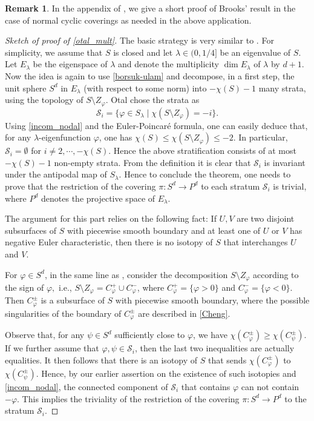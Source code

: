 \documentclass[a4paper,11pt]{amsart}
\numberwithin{equation}{section}
\theoremstyle{definition}
\newtheorem{rem}[equation]{Remark}
\def\vf{\varphi}
\begin{document}
\begin{rem} 
In the appendix of \cite{BMM3}, we give a short proof of Brooks' result in the case of normal cyclic coverings
as needed in the above application.
\end{rem}

\begin{proof}[Sketch of proof of \cref{otal_mult}]
The basic strategy is very similar to \cite{Se}.
For simplicity, we assume that $S$ is closed and let $\lambda\in(0,1/4]$ be an eigenvalue of $S$.
Let $E_\lambda$ be the eigenspace of $\lambda$
and denote the multiplicity $\dim E_\lambda$ of $\lambda$ by $d+1$.
Now the idea is again to use \cref{borsuk-ulam} and decompose, in a first step, the unit sphere $S^d$ in $E_\lambda$ (with respect to some norm) into $-\chi(S) -1$ many strata, using the topology of $S\setminus Z_\vf$. 
Otal chose the strata as
\begin{equation*}
\mathcal{S}_i = \{\varphi \in S_\lambda \mid \chi(S \setminus Z_\varphi)= -i\}.
\end{equation*}
Using \cref{incom_nodal} and the Euler-Poincar\'{e} formula, one can easily deduce that, for any $\lambda$-eigenfunction $\vf$, one has $ \chi(S) \le \chi(S \setminus Z_{\vf}) \le -2$.
In particular, $\mathcal{S}_i=\emptyset$ for $i \neq 2, \cdots, -\chi(S).$
Hence the above stratification consists of at most $-\chi(S) -1$ non-empty strata. 
From the definition it is clear that $\mathcal{S}_i$ is invariant under the antipodal map of $S_\lambda$.
Hence to conclude the theorem, one needs to prove that the restriction of the covering $\pi\colon S^d\to P^d$ to each stratum $\mathcal{S}_i$ is trivial,
where $P^d$ denotes the projective space of $E_\lambda$.

The argument for this part relies on the following fact:
If $U, V$ are two disjoint subsurfaces of $S$ with piecewise smooth boundary and at least one of $U$ or $V$ has negative Euler characteristic, then there is no isotopy of $S$ that interchanges $U$ and $V$.

For $\varphi \in S^d$, in the same line as \cite{Se}, consider the decomposition $S \setminus Z_\varphi$ according to the sign of $\varphi,$ 
i.e., $S\setminus Z_\varphi = C^+_\varphi \cup C^-_\varphi$, where $C^+_\varphi=\{\varphi>0\}$  and $C^-_\varphi=\{\vf<0\}$. 
Then $C^\pm_\varphi$ is a subsurface of $S$ with piecewise smooth boundary, 
where the possible singularities of the boundary of $C^\pm_\varphi$ are described in \cref{Cheng}.

Observe that, for any $\psi \in S^d$ sufficiently close to $\vf$, we have $\chi(C^\pm_\varphi) \ge \chi(C^\pm_\psi)$.
If we further assume that $\vf, \psi \in \mathcal{S}_i$, then the last two inequalities are actually equalities.
It then follows that there is an isotopy of $S$ that sends $\chi(C^\pm_\varphi)$ to $\chi(C^\pm_\psi)$. 
Hence, by our earlier assertion on the existence of such isotopies and \cref{incom_nodal}, the connected component of $\mathcal{S}_i$ that contains $\vf$ can not contain $-\vf$. 
This implies the triviality of the restriction of the covering $\pi\colon S^d \to P^d$ to the stratum $\mathcal{S}_i$.
\end{proof}
\end{document}
